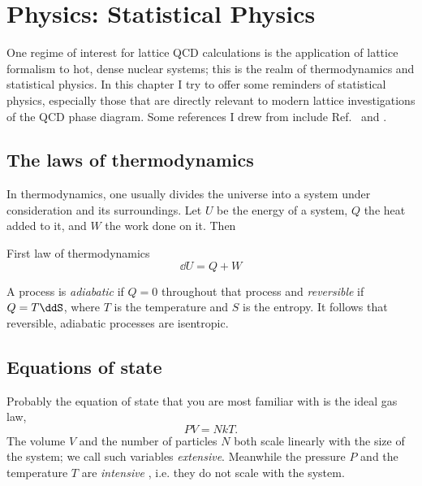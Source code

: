 \chapter{Physics: Statistical Physics}

One regime of interest for lattice QCD calculations is the application
of lattice formalism to hot, dense nuclear systems; this is the realm
of thermodynamics and statistical physics. In this chapter I try to
offer some reminders of statistical physics, especially those that
are directly relevant to modern lattice investigations of the QCD
phase diagram. Some references I drew from include
Ref.~\cite{tahir-kheli_general_2012} and \cite{kardar_statistical_2007}.

\section{The laws of thermodynamics}

In thermodynamics, one usually divides the universe into a system under
consideration and its surroundings. Let $U$ be the energy of a system,
$Q$ the heat added to it, and
$W$ the work done on it. Then
\begin{theorem}{First law of thermodynamics}{}
  $$\dd U=Q+W$$
\end{theorem}

A process is {\it adiabatic} if $Q=0$ throughout that process
and {\it reversible} if $Q=T\ddS$, where $T$ is the
temperature and $S$ is the entropy. It follows that reversible,
adiabatic processes are isentropic. 


\section{Equations of state}\label{sec:EoS}


Probably the equation of state that you are most familiar with is the 
ideal gas law,
\begin{equation}
  PV=NkT.
\end{equation}
The volume $V$ and the number of particles $N$ both scale linearly with the
size of the system; we call such variables {\it extensive}. 
Meanwhile the pressure $P$ and the temperature $T$ are {\it intensive}
, i.e. they do not scale with the system.

